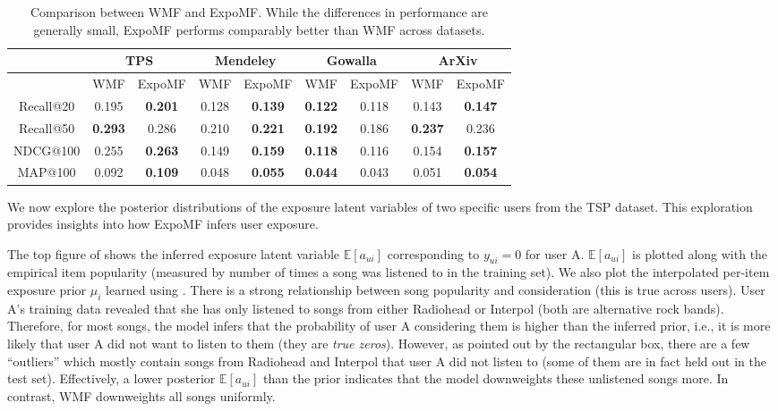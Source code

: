 \begin{table}
\centering
\begin{tabular}{ c  c c  c c  c c  c c  }
   & \multicolumn{2}{c}{\textbf{TPS}} & \multicolumn{2}{c}{\textbf{Mendeley}} & \multicolumn{2}{c}{\textbf{Gowalla}} & \multicolumn{2}{c}{\textbf{ArXiv}} \\ \toprule
    & WMF & ExpoMF	& WMF & ExpoMF 	& WMF& ExpoMF &	 WMF & ExpoMF \\ \midrule
  Recall@20 &  0.195 &  \textbf{0.201}              & 0.128 &  \textbf{0.139}                & \textbf{0.122} & 0.118                          &  0.143 & \textbf{0.147} \\
  Recall@50 &  \textbf{0.293} &  0.286              & 0.210 & \textbf{0.221}                  & \textbf{0.192} & 0.186                         & \textbf{0.237} & 0.236 \\
  NDCG@100  &  0.255 &  \textbf{0.263}              & 0.149 & \textbf{0.159}                 & \textbf{0.118} & 0.116                         & 0.154 & \textbf{0.157} \\
  MAP@100   &  0.092 &  \textbf{0.109}             & 0.048 & \textbf{0.055}                  & \textbf{0.044} & 0.043                         & 0.051 & \textbf{0.054}\\ \bottomrule
\end{tabular}
\caption{Comparison between \gls{WMF} \citep{hu2008collaborative} and ExpoMF. While
the differences in performance are generally small, ExpoMF performs comparably better than WMF across datasets.}
\label{chpt:expomf:tab:cfresults}
\end{table}


 We now explore the posterior distributions of the exposure latent variables of two specific users from the TSP dataset. This
exploration provides insights into how ExpoMF infers user exposure. 

The top figure of  shows the inferred exposure latent variable
$\mathbb{E}[a_{ui}]$ corresponding to $y_{ui} = 0$ for user A.
$\mathbb{E}[a_{ui}]$ is plotted along with the empirical item popularity
(measured by number of times a song was listened to in the training set).
We also plot the interpolated per-item exposure prior $\mu_i$ 
learned using . There is a strong relationship between song
popularity and consideration (this is true across users). User A's
training data revealed that she has only listened to songs from either
Radiohead or Interpol (both are alternative rock bands). Therefore, for
most songs, the model infers that the probability of user A considering
them is higher than the inferred prior, i.e., it is more likely that user
A did not want to listen to them (they are \emph{true zeros}). However, as
pointed out by the rectangular box, there
are a few ``outliers'' which mostly contain songs from Radiohead and
Interpol that user A did not listen to (some of them are in fact held out
in the test set). Effectively, a lower posterior $\mathbb{E}[a_{ui}]$ than
the prior indicates that the model downweights these unlistened songs
more. In contrast, \gls{WMF} downweights all songs uniformly. 

